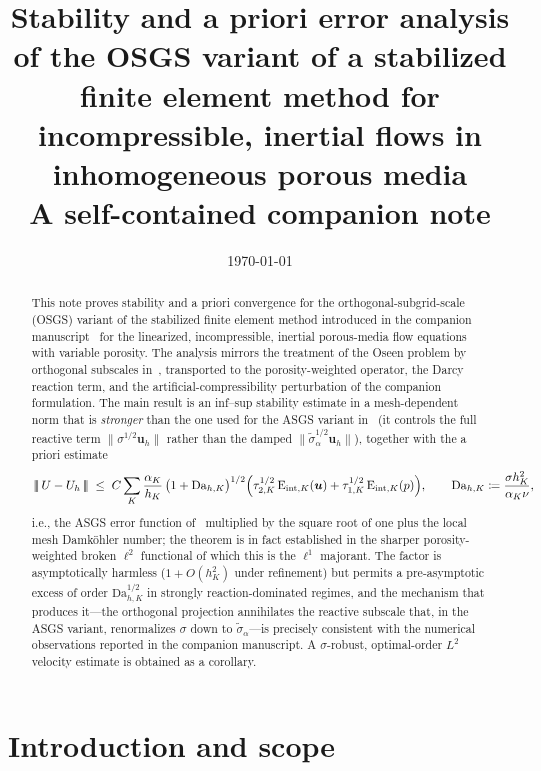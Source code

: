 \documentclass[11pt]{article}
\title{Stability and a priori error analysis of the OSGS variant of a stabilized
finite element method for incompressible, inertial flows in inhomogeneous
porous media\\[1ex]
\large A self-contained companion note}
\author{}
\date{\today}
\theoremstyle{remark}
\newcommand{\bu}{\boldsymbol{u}}
\newcommand{\norm}[1]{\lVert #1 \rVert}
\newcommand{\tnorm}[1]{\lvert\!\lvert\!\lvert\, #1 \,\rvert\!\rvert\!\rvert}
\newcommand{\Eint}[2]{\mathrm{E}_{\mathrm{int},#1}(#2)}
\newcommand{\Dah}{\mathrm{Da}_{h,K}}
\begin{document}
\maketitle

\begin{abstract}
This note proves stability and a priori convergence for the orthogonal-subgrid-scale
(OSGS) variant of the stabilized finite element method introduced in the companion
manuscript~\cite{companion} for the linearized, incompressible, inertial porous-media
flow equations with variable porosity. The analysis mirrors the treatment of the Oseen
problem by orthogonal subscales in~\cite{Codina2008}, transported to the porosity-weighted
operator, the Darcy reaction term, and the artificial-compressibility perturbation of the
companion formulation. The main result is an inf--sup stability estimate in a mesh-dependent
norm that is \emph{stronger} than the one used for the ASGS variant in~\cite{companion}
(it controls the full reactive term $\norm{\sigma^{1/2}\bu_h}$ rather than the damped
$\lVert\widetilde{\sigma}_\alpha^{1/2}\bu_h\rVert$), together with the a priori estimate
\[
  \tnorm{U - U_h}
  \;\le\;
  C \sum_{K}
  \frac{\alpha_K}{h_K}\,\bigl(1 + \Dah\bigr)^{1/2}
  \Bigl( \tau_{2,K}^{1/2}\,\Eint{K}{\bu} + \tau_{1,K}^{1/2}\,\Eint{K}{p} \Bigr),
  \qquad
  \Dah \coloneqq \frac{\sigma h_K^2}{\alpha_K \nu},
\]
i.e., the ASGS error function of~\cite{companion} multiplied by the square root of one
plus the local mesh Damk\"ohler number; the theorem is in fact established in the sharper
porosity-weighted broken $\ell^2$ functional of which this is the $\ell^1$ majorant.
The factor is asymptotically harmless
($1 + O(h_K^2)$ under refinement) but permits a pre-asymptotic excess of order
$\Dah^{1/2}$ in strongly reaction-dominated regimes, and the mechanism that produces
it---the orthogonal projection annihilates the reactive subscale that, in the ASGS
variant, renormalizes $\sigma$ down to $\widetilde{\sigma}_\alpha$---is precisely
consistent with the numerical observations reported in the companion manuscript.
A $\sigma$-robust, optimal-order $L^2$ velocity estimate is obtained as a corollary.
\end{abstract}

\section{Introduction and scope}
\label{sec:intro}
\end{document}
